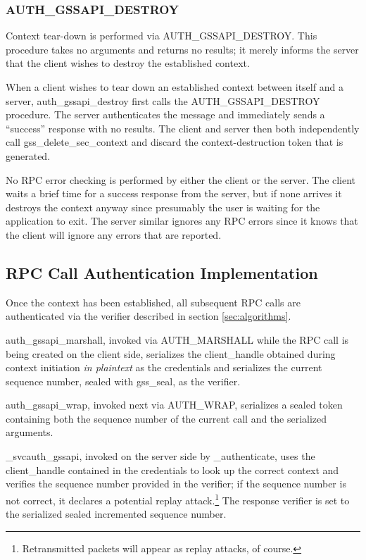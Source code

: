 \subsubsection{AUTH_GSSAPI_DESTROY}

Context tear-down is performed via AUTH_GSSAPI_DESTROY.  This
procedure takes no arguments and returns no results; it merely informs
the server that the client wishes to destroy the established context.

When a client wishes to tear down an established context between
itself and a server, auth_gssapi_destroy first calls the
AUTH_GSSAPI_DESTROY procedure.  The server authenticates the message
and immediately sends a ``success'' response with no results.  The
client and server then both independently call gss_delete_sec_context
and discard the context-destruction token that is generated.

No RPC error checking is performed by either the client or the server.
The client waits a brief time for a success response from the server,
but if none arrives it destroys the context anyway since presumably
the user is waiting for the application to exit.  The server similar
ignores any RPC errors since it knows that the client will ignore any
errors that are reported.

\subsection{RPC Call Authentication Implementation}

Once the context has been established, all subsequent RPC calls are
authenticated via the verifier described in section
\ref{sec:algorithms}.

auth_gssapi_marshall, invoked via AUTH_MARSHALL while the RPC call is
being created on the client side, serializes the client_handle
obtained during context initiation {\it in plaintext} as the
credentials and serializes the current sequence number, sealed with
gss_seal, as the verifier.

auth_gssapi_wrap, invoked next via AUTH_WRAP, serializes a sealed
token containing both the sequence number of the current call and the
serialized arguments.

_svcauth_gssapi, invoked on the server side by _authenticate, uses the
client_handle contained in the credentials to look up the correct
context and verifies the sequence number provided in the verifier; if
the sequence number is not correct, it declares a potential replay
attack.\footnote{Retransmitted packets will appear as replay attacks,
of course.} The response verifier is set to the serialized sealed
incremented sequence number.

